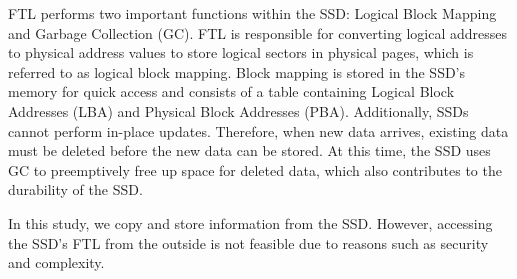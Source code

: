 FTL performs two important functions within the SSD: Logical Block Mapping and Garbage Collection (GC).
FTL is responsible for converting logical addresses to physical address values to store logical sectors in physical pages, which is referred to as logical block mapping.
Block mapping is stored in the SSD's memory for quick access and consists of a table containing Logical Block Addresses (LBA) and Physical Block Addresses (PBA).
Additionally, SSDs cannot perform in-place updates.
Therefore, when new data arrives, existing data must be deleted before the new data can be stored.
At this time, the SSD uses GC to preemptively free up space for deleted data, which also contributes to the durability of the SSD.

In this study, we copy and store information from the SSD.
However, accessing the SSD's FTL from the outside is not feasible due to reasons such as security and complexity.
